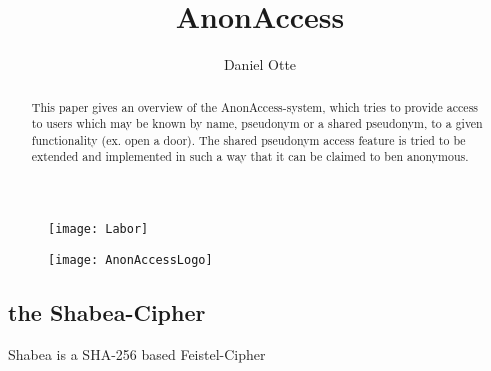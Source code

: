 \documentclass[10pt,a4paper]{article}
\author{Daniel Otte}
\title{AnonAccess}
\begin{document}
 
\maketitle

\begin{figure}
 \begin{minipage}[b]{.3\linewidth}
 \texttt{[image: Labor]} 
 \end{minipage}
 \hspace{0.5\linewidth}
 \begin{minipage}[b]{.3\linewidth}
 \texttt{[image: AnonAccessLogo]} 
 \end{minipage}
\end{figure}

\begin{abstract}
This paper gives an overview of the AnonAccess-system, which tries to provide access to users which may be known by name, pseudonym or a shared pseudonym, to a given functionality (ex. open a door). The shared pseudonym access feature is tried to be extended and implemented in such a way that it can be claimed to ben anonymous.
\end{abstract}





\begin{appendix}


\section{the Shabea-Cipher}
Shabea is a SHA-256 based Feistel-Cipher
\end{appendix}
\end{document}
